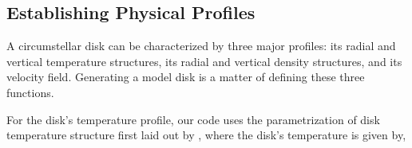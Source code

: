 \subsection{Establishing Physical Profiles}
\label{subsection:physical_profs}
A circumstellar disk can be characterized by three major profiles: its radial and vertical temperature structures, its radial and vertical density structures, and its velocity field. Generating a model disk is a matter of defining these three functions.







For the disk's temperature profile, our code uses the parametrization of disk temperature structure first laid out by \citet{Dartois2003}, where the disk's temperature is given by,

